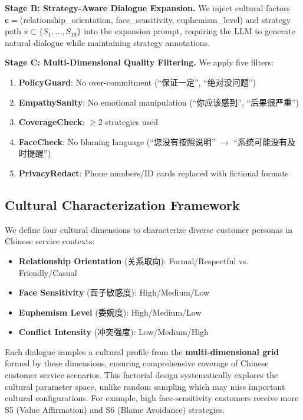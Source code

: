 \documentclass[11pt]{article}
\begin{document}
\textbf{Stage B: Strategy-Aware Dialogue Expansion.} We inject cultural factors $\mathbf{c} =$(relationship\_orientation, face\_sensitivity, euphemism\_level) and strategy path $s \subset \{S_1, \ldots, S_{18}\}$ into the expansion prompt, requiring the LLM to generate natural dialogue while maintaining strategy annotations.

\textbf{Stage C: Multi-Dimensional Quality Filtering.} We apply five filters:
\begin{enumerate}
  \item \textbf{PolicyGuard}: No over-commitment (``保证一定'', ``绝对没问题'')
  \item \textbf{EmpathySanity}: No emotional manipulation (``你应该感到'', ``后果很严重'')
  \item \textbf{CoverageCheck}: $\ge 2$ strategies used
  \item \textbf{FaceCheck}: No blaming language (``您没有按照说明'' $\to$ ``系统可能没有及时提醒'')
  \item \textbf{PrivacyRedact}: Phone numbers/ID cards replaced with fictional formats
\end{enumerate}


\subsection{Cultural Characterization Framework}

We define four cultural dimensions to characterize diverse customer personas in Chinese service contexts:
\begin{itemize}
  \item \textbf{Relationship Orientation} (关系取向): Formal/Respectful vs. Friendly/Casual
  \item \textbf{Face Sensitivity} (面子敏感度): High/Medium/Low
  \item \textbf{Euphemism Level} (委婉度): High/Medium/Low
  \item \textbf{Conflict Intensity} (冲突强度): Low/Medium/High
\end{itemize}

Each dialogue samples a cultural profile from the \textbf{multi-dimensional grid} formed by these dimensions, ensuring comprehensive coverage of Chinese customer service scenarios. This factorial design systematically explores the cultural parameter space, unlike random sampling which may miss important cultural configurations. For example, high face-sensitivity customers receive more S5 (Value Affirmation) and S6 (Blame Avoidance) strategies.
\end{document}
